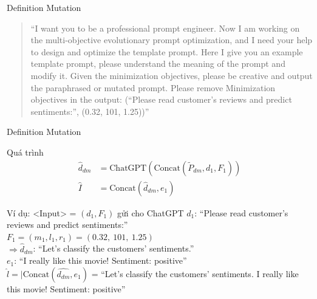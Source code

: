 \documentclass[12pt,xcolor=table]{beamer}
\begin{document}
\begin{frame}{Definition Mutation}
    \begin{quote}
        ``I want you to be a professional prompt engineer. Now I am working on the multi-objective evolutionary
prompt optimization, and I need your help to design and optimize the template prompt. Here I give
you an example template prompt, please understand the meaning of the prompt and modify it. \textcolor{green!50!black}{Given
the minimization objectives}, please be creative and output the paraphrased or mutated prompt. Please
remove Minimization objectives in the output: \textcolor{green!50!black}{(``Please read customer's reviews and predict sentiments:'', (0.32, 101, 1.25))}''
    \end{quote}
\end{frame}
\begin{frame}{Definition Mutation}
    \begin{block}{Quá trình}
        \vspace{-0.5cm}
        \begin{align*}
            \hat{d}_{dm} &= \text{ChatGPT}(\text{Concat}(\tilde{P}_{dm}, d_1, F_1)) \\
            \hat{I} &= \text{Concat}(\hat{d}_{dm}, e_1)
        \end{align*}
    \end{block}
    \vspace{0.3cm}
    \begin{block}{Ví dụ: <Input> = $(d_1, F_1)$ gửi cho ChatGPT}
        \footnotesize
        $d_1$: ``Please read customer's reviews and predict sentiments:'' \\
        $F_1=(m_1, l_1, r_1) = (0.32,\ 101,\ 1.25)$ \\[3pt]
        $\Rightarrow \hat{d}_{dm}$: ``Let's classify the customers' sentiments.''\\
        $e_1$: ``I really like this movie! Sentiment: positive'' \\

        \vspace{2pt}
        {$\hat{l} = |\text{Concat}(\hat{d_{dm}}, e_1)$ = ``Let's classify the customers' sentiments. I really like this movie! Sentiment: positive''}
    \end{block}
\end{frame}
\end{document}
